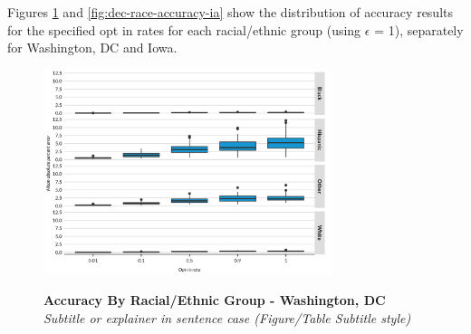 \documentclass[
]{urban-formatting}
\begin{document}
Figures \ref{fig:dec-race-accuracy-dc} and
\ref{fig:dec-race-accuracy-ia} show the distribution of accuracy results
for the specified opt in rates for each racial/ethnic group (using
\(\epsilon\) = 1), separately for Washington, DC and Iowa.

\begin{figure}[htbp]
    \caption{
    \textbf{Accuracy By Racial/Ethnic Group - Washington, DC}\\
    \textit{Subtitle or explainer in sentence case (Figure/Table Subtitle style)}
    }
    \centering
    \includegraphics[width=0.75\textwidth]{../analysis/figures/dec-race-accuracy-dc.png}
    \label{fig:dec-race-accuracy-dc}
\end{figure}
\begin{singlespace}
    \\
\end{singlespace}
\end{document}
